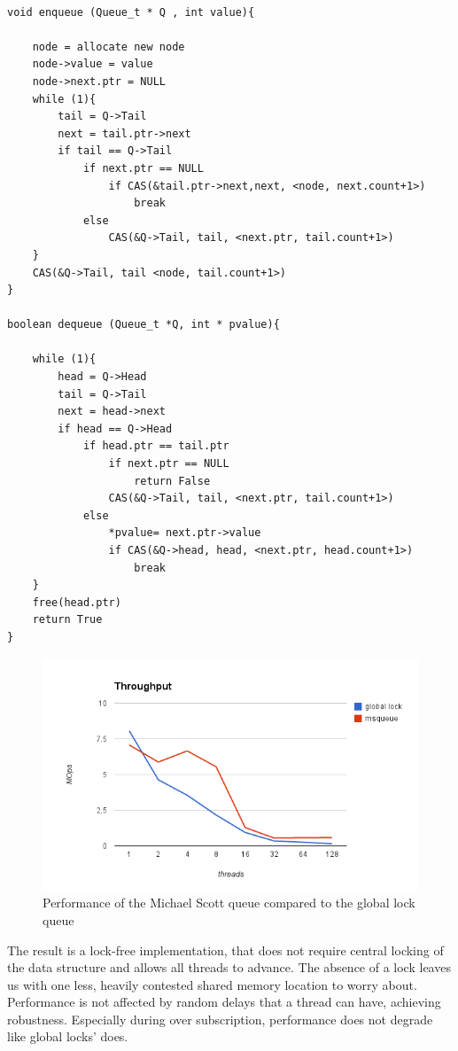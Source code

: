 \begin{lstlisting}[caption={Michael Scott queue pseudocode}]

void enqueue (Queue_t * Q , int value){
	
	node = allocate new node
	node->value = value
	node->next.ptr = NULL
	while (1){
		tail = Q->Tail
		next = tail.ptr->next
		if tail == Q->Tail
			if next.ptr == NULL
				if CAS(&tail.ptr->next,next, <node, next.count+1>)
					break
			else
				CAS(&Q->Tail, tail, <next.ptr, tail.count+1>)  
	}				
	CAS(&Q->Tail, tail <node, tail.count+1>)	
}

boolean dequeue (Queue_t *Q, int * pvalue){
	
	while (1){
		head = Q->Head
		tail = Q->Tail
		next = head->next
		if head == Q->Head
			if head.ptr == tail.ptr
				if next.ptr == NULL
					return False
				CAS(&Q->Tail, tail, <next.ptr, tail.count+1>)
			else
				*pvalue= next.ptr->value
				if CAS(&Q->head, head, <next.ptr, head.count+1>)
					break
	}
	free(head.ptr)
	return True
}

\end{lstlisting}

\begin{figure}
 \centering
  \includegraphics[scale=0.7]{queue_msqueue_perf.png}
 \caption{ Performance of the Michael Scott queue compared to the global lock queue}
\label{queue_msqueue_perf}
\end{figure}

The result is a lock-free implementation,  that does not require central locking of the data structure and allows all threads to advance. The absence of a lock leaves us with one less, heavily contested shared memory location to worry about. Performance is not affected by random delays that a thread can have, achieving robustness. Especially during over subscription, performance does not degrade like global locks' does.

